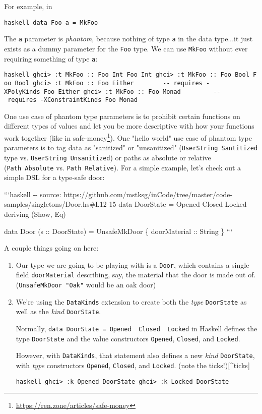 \documentclass[]{article}
\renewcommand{\href}[2]{#2\footnote{\url{#1}}}
\begin{document}
For example, in

\texttt{haskell\ data\ Foo\ a\ =\ MkFoo}

The \texttt{a} parameter is \emph{phantom}, because nothing of type \texttt{a}
in the data type...it just exists as a dummy parameter for the \texttt{Foo}
type. We can use \texttt{MkFoo} without ever requiring something of type
\texttt{a}:

\texttt{haskell\ ghci\textgreater{}\ :t\ MkFoo\ ::\ Foo\ Int\ Foo\ Int\ ghci\textgreater{}\ :t\ MkFoo\ ::\ Foo\ Bool\ Foo\ Bool\ ghci\textgreater{}\ :t\ MkFoo\ ::\ Foo\ Either\ \ \ \ \ \ \ \ -\/-\ requires\ -XPolyKinds\ Foo\ Either\ ghci\textgreater{}\ :t\ MkFoo\ ::\ Foo\ Monad\ \ \ \ \ \ \ \ \ -\/-\ requires\ -XConstraintKinds\ Foo\ Monad}

One use case of phantom type parameters is to prohibit certain functions on
different types of values and let you be more descriptive with how your
functions work together (like in
\href{https://ren.zone/articles/safe-money}{safe-money}). One "hello world" use
case of phantom type parameters is to tag data as "sanitized" or "unsanitized"
(\texttt{UserString\ \textquotesingle{}Santitized} type vs.
\texttt{UserString\ \textquotesingle{}Unsanitized}) or paths as absolute or
relative (\texttt{Path\ \textquotesingle{}Absolute} vs.
\texttt{Path\ \textquotesingle{}Relative}). For a simple example, let's check
out a simple DSL for a type-safe door:

```haskell -\/- source:
https://github.com/mstksg/inCode/tree/master/code-samples/singletons/Door.hs\#L12-15
data DoorState = Opened \textbar{} Closed \textbar{} Locked deriving (Show, Eq)

data Door (s :: DoorState) = UnsafeMkDoor \{ doorMaterial :: String \} ```

A couple things going on here:

\begin{enumerate}
\item
  Our type we are going to be playing with is a \texttt{Door}, which contains a
  single field \texttt{doorMaterial} describing, say, the material that the door
  is made out of. (\texttt{UnsafeMkDoor\ "Oak"} would be an oak door)
\item
  We're using the \texttt{DataKinds} extension to create both the \emph{type}
  \texttt{DoorState} as well as the \emph{kind} \texttt{DoorState}.

  Normally,
  \texttt{data\ DoorState\ =\ Opened\ \textbar{}\ Closed\ \textbar{}\ Locked} in
  Haskell defines the type \texttt{DoorState} and the value constructors
  \texttt{Opened}, \texttt{Closed}, and \texttt{Locked}.

  However, with \texttt{DataKinds}, that statement also defines a new
  \emph{kind} \texttt{DoorState}, with \emph{type} constructors
  \texttt{\textquotesingle{}Opened}, \texttt{\textquotesingle{}Closed}, and
  \texttt{\textquotesingle{}Locked}. (note the \texttt{\textquotesingle{}}
  ticks!){[}\^{}ticks{]}

  \texttt{haskell\ ghci\textgreater{}\ :k\ \textquotesingle{}Opened\ DoorState\ ghci\textgreater{}\ :k\ \textquotesingle{}Locked\ DoorState}
\end{enumerate}
\end{document}
